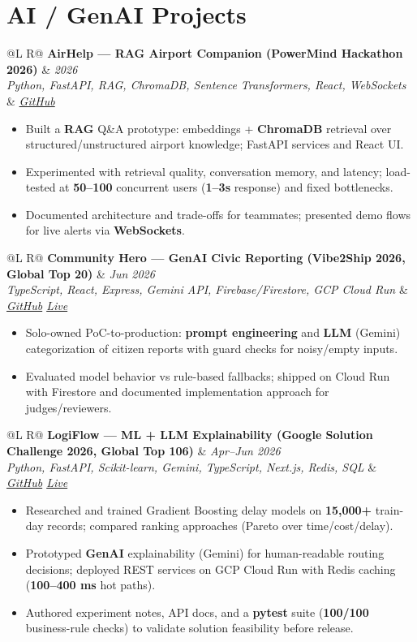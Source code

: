 \documentclass[a4paper,10pt]{article}
\makeatletter
\newcommand{\proj}[4]{%
  \vspace{1.5mm}
  \noindent\begin{tabularx}{\textwidth}{@{}L R@{}}
    \textbf{#1} & \textit{\small #2} \\
    \textit{\small #3} & \textit{\small #4} \\
  \end{tabularx}\par
  \vspace{0.5mm}%
}
\makeatother
\begin{document}
\section{AI / GenAI Projects}
\proj{AirHelp --- RAG Airport Companion (PowerMind Hackathon 2026)}{2026}
{Python, FastAPI, RAG, ChromaDB, Sentence Transformers, React, WebSockets}
{\href{https://github.com/Ojas-Srivastava05/AirHelp-AI-Airport-Assistant}{GitHub}}
\begin{itemize}
  \item Built a \textbf{RAG} Q\&A prototype: embeddings + \textbf{ChromaDB} retrieval over structured/unstructured airport knowledge; FastAPI services and React UI.
  \item Experimented with retrieval quality, conversation memory, and latency; load-tested at \textbf{50--100} concurrent users (\textbf{1--3s} response) and fixed bottlenecks.
  \item Documented architecture and trade-offs for teammates; presented demo flows for live alerts via \textbf{WebSockets}.
\end{itemize}

\proj{Community Hero --- GenAI Civic Reporting (Vibe2Ship 2026, Global Top 20)}{Jun 2026}
{TypeScript, React, Express, Gemini API, Firebase/Firestore, GCP Cloud Run}
{\href{https://github.com/Ojas-Srivastava05/community-hero}{GitHub} \textbar{} \href{https://community-hero-987477089222.asia-south1.run.app}{Live}}
\begin{itemize}
  \item Solo-owned PoC-to-production: \textbf{prompt engineering} and \textbf{LLM} (Gemini) categorization of citizen reports with guard checks for noisy/empty inputs.
  \item Evaluated model behavior vs rule-based fallbacks; shipped on Cloud Run with Firestore and documented implementation approach for judges/reviewers.
\end{itemize}

\proj{LogiFlow --- ML + LLM Explainability (Google Solution Challenge 2026, Global Top 106)}{Apr--Jun 2026}
{Python, FastAPI, Scikit-learn, Gemini, TypeScript, Next.js, Redis, SQL}
{\href{https://github.com/Ojas-Srivastava05/LogiFlow-Solution-Challenge-2026}{GitHub} \textbar{} \href{https://logi-flow-solution-challenge-2026.vercel.app}{Live}}
\begin{itemize}
  \item Researched and trained Gradient Boosting delay models on \textbf{15,000+} train-day records; compared ranking approaches (Pareto over time/cost/delay).
  \item Prototyped \textbf{GenAI} explainability (Gemini) for human-readable routing decisions; deployed REST services on GCP Cloud Run with Redis caching (\textbf{100--400 ms} hot paths).
  \item Authored experiment notes, API docs, and a \textbf{pytest} suite (\textbf{100/100} business-rule checks) to validate solution feasibility before release.
\end{itemize}
\end{document}
